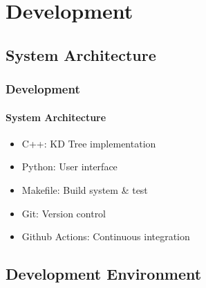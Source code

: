 \documentclass[
	12pt, %
	aspectratio=169, %
]{beamer}
\begin{document}


\section{Development}
\subsection{System Architecture}

\begin{frame}
	\frametitle{Development}
	\framesubtitle{System Architecture}

	\begin{itemize}
		\item C++: KD Tree implementation
		\item Python: User interface
		\item Makefile: Build system \& test
		\item Git: Version control
		\item Github Actions: Continuous integration
	\end{itemize}
\end{frame}


\subsection{Development Environment}
\end{document}
